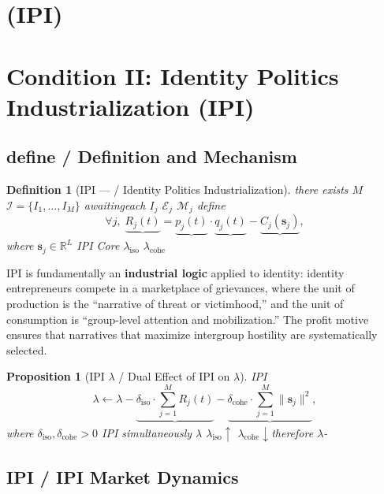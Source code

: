 \documentclass[11pt,a4paper]{article}
\newtheorem{proposition}[theorem]{Proposition}
\newtheorem{definition}[theorem]{Definition}
\theoremstyle{remark}
\newcommand{\R}{\mathbb{R}}
\newcommand{\lambdaparam}{\lambda}
\begin{document}
\section{ (IPI)}
\section{Condition II: Identity Politics Industrialization (IPI)}

\subsection{define / Definition and Mechanism}

\begin{definition}[IPI —  / Identity Politics Industrialization]
\label{def:IPI}
there exists $M$  $\mathcal{I} = \{I_1, \ldots, I_M\}$
awaitingeach $I_j$ \textbf{}
$\mathcal{E}_j$ \textbf{} $\mathcal{M}_j$
define
\[
\forall j,\; \underbrace{R_j(t)}_{\text{}} = 
\underbrace{p_j(t)}_{\text{}} \cdot 
\underbrace{q_j(t)}_{\text{}} - 
\underbrace{C_j(\mathbf{s}_j)}_{\text{}},
\]
where $\mathbf{s}_j \in \R^L$ 
IPI Core
 $\lambdaparam_{\text{iso}}$  $\lambdaparam_{\text{cohe}}$
\end{definition}

IPI is fundamentally an \textbf{industrial logic} applied to identity: identity
entrepreneurs compete in a marketplace of grievances, where the unit of production
is the ``narrative of threat or victimhood,'' and the unit of consumption is
``group-level attention and mobilization.'' The profit motive ensures that narratives
that maximize intergroup hostility are systematically selected.

\begin{proposition}[IPI  $\lambdaparam$  / Dual Effect of IPI on $\lambdaparam$]
\label{prop:IPI_lambda}
 IPI 
\[
\lambdaparam \leftarrow \lambdaparam -
\underbrace{\delta_{\text{iso}} \cdot \sum_{j=1}^{M} R_j(t)}_{\text{}} -
\underbrace{\delta_{\text{cohe}} \cdot \sum_{j=1}^{M} \|\mathbf{s}_j\|^2}_{\text{}},
\]
where $\delta_{\text{iso}}, \delta_{\text{cohe}} > 0$ IPI 
simultaneously $\lambdaparam$ $\lambdaparam_{\text{iso}} \uparrow$ 
$\lambdaparam_{\text{cohe}} \downarrow$therefore $\lambdaparam$-
\end{proposition}

\subsection{IPI  / IPI Market Dynamics}
\end{document}
